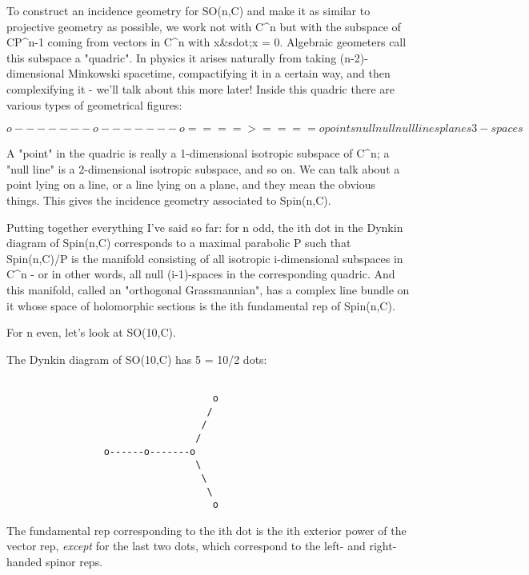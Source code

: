 To construct an incidence geometry for SO(n,C) and make it as similar to
projective geometry as possible, we work not with C^{n} but with the
subspace of CP^{n-1} coming from vectors in C^{n} with 
x&sdot;x = 0.
Algebraic geometers call this subspace a "quadric".  
In physics it arises naturally from taking (n-2)-dimensional
Minkowski spacetime, compactifying it in a certain way, and then 
complexifying it - we'll talk about this more later!
Inside this quadric there are various types of geometrical figures:



$$

                 o-------o-------o====>====o 
            points     null     null      null
                      lines    planes    3-spaces
$$
    
A "point" in the quadric is really a 1-dimensional isotropic subspace 
of C^{n}; a "null line" is a 2-dimensional isotropic 
subspace, and 
so on.  We can talk about a point lying on a line, or a line lying on a plane,
and they mean the obvious things.  This gives the incidence geometry
associated to Spin(n,C).

Putting together everything I've said so far: for n odd, the ith dot in
the Dynkin diagram of Spin(n,C) corresponds to a maximal parabolic P
such that Spin(n,C)/P is the manifold consisting of all isotropic
i-dimensional subspaces in C^{n} - or in other words, 
all null (i-1)-spaces in the corresponding quadric.  And this manifold, 
called an "orthogonal Grassmannian", has a complex line 
bundle on it whose space of holomorphic sections is the ith fundamental 
rep of Spin(n,C).

For n even, let's look at SO(10,C).

The Dynkin diagram of SO(10,C) has 5 = 10/2 dots:
   

\begin{verbatim}

                                    o 
                                   /
                                  /
                                 /
                 o------o-------o 
                                 \
                                  \
                                   \
                                    o
\end{verbatim}
    
The fundamental rep corresponding to the ith dot is the 
ith exterior power of the vector rep, \emph{except} for the last 
two dots, which correspond to the left- and right-handed
spinor reps.

